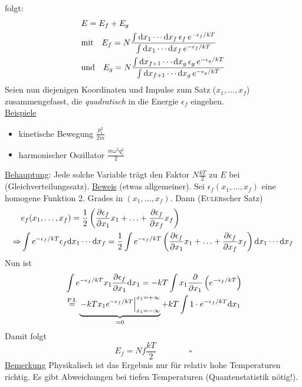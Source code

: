 folgt:
\begin{equation}
    \begin{split}
        & E = E_f + E_g \\
        & \text{mit} \quad E_f = N \frac{\int \mathrm{d} x_1 \cdots \mathrm{d} x_f \, \epsilon_f \, e^{-\epsilon_f / kT}}{\int \mathrm{d} x_1 \cdots \mathrm{d} x_f \, e^{-\epsilon_f / kT}} \\
        & \text{und} \quad E_g = N \frac{\int \mathrm{d} x_{f+1} \cdots \mathrm{d} x_g \, \epsilon_g \, e^{-\epsilon_g / kT}}{\int \mathrm{d} x_{f+1} \cdots \mathrm{d} x_g \, e^{-\epsilon_g / kT}}
    \end{split}
\end{equation}
Seien nun diejenigen Koordinaten und Impulse zum Satz ($x_1, \ldots, x_f$) zusammengefasst, die \emph{quadratisch} in die Energie $\epsilon_f$ eingehen. \\
\underline{Beispiele}
\begin{itemize}
    \item kinetische Bewegung $\frac{p_i^2}{2 m}$
    \item harmonischer Oszillator $\frac{m \omega^2 q^2_i}{2}$
\end{itemize}
\underline{Behauptung}: Jede solche Variable trägt den Faktor $N \frac{k T}{2}$ zu $E$ bei (Gleichverteilungssatz).
\underline{Beweis} (etwas allgemeiner). Sei $\epsilon_f (x_1, \ldots, x_f)$ eine homogene Funktion 2. Grades in $(x_1, \ldots, x_f)$. Dann
(\textsc{Euler}scher Satz)
\begin{equation}
    \begin{split}
        & e_f(x_1, \ldots, x_f) = \frac{1}{2} \left( \frac{\partial \epsilon_f}{\partial x_1} x_1 + \ldots + \frac{\partial \epsilon_f}{\partial x_f} x_f \right) \\
        \Rightarrow & \int e^{- \epsilon_f / kT} \epsilon_f \mathrm{d} x_1 \cdots \mathrm{d} x_f = \frac{1}{2} \int e^{- \epsilon_f / kT} \left( \frac{\partial \epsilon_f}{\partial x_1} x_1 + \ldots + \frac{\partial \epsilon_f}{\partial x_f} x_f \right) \mathrm{d} x_1 \cdots \mathrm{d} x_f
    \end{split}
\end{equation}
Nun ist
\begin{equation}
    \begin{split}
        & \int e^{- \epsilon_f / kT} x_1 \frac{\partial \epsilon_f}{\partial x_1} \mathrm{d} x_1 = - k T \int x_1 \frac{\partial}{\partial x_1} \left( e^{- \epsilon_f / kT} \right) \\
        & \overset{ \text{P.I.}}{=} \underbrace{\left. - k T x_1 e^{- \epsilon_f / kT} \right|_{x_1 = -\infty}^{x_1 = + \infty}}_{=0} + k T \int 1 \cdot e^{- \epsilon_f / k T} \mathrm{d} x_1
    \end{split}
\end{equation}
Damit folgt
\begin{equation}
    E_f = N f \frac{k T}{2} \qquad \qquad \square
\end{equation}
\underline{Bemerkung} Physikalisch ist das Ergebnis nur für relativ hohe Temperaturen richtig. Es gibt Abweichungen bei tiefen Temperaturen (Quantenstatistik nötig!).

